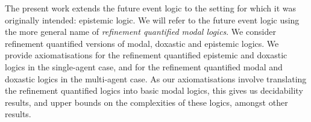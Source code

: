 The present work extends the future event logic to the setting for which it was
originally intended: epistemic logic. We will refer to the future event logic
using the more general name of {\em refinement quantified modal logics}. We
consider refinement quantified versions of modal, doxastic and epistemic logics.
We provide axiomatisations for the refinement quantified epistemic and doxastic
logics in the single-agent case, and for the refinement quantified modal and
doxastic logics in the multi-agent case. As our axiomatisations involve
translating the refinement quantified logics into basic modal logics, this gives
us decidability results, and upper bounds on the complexities of these logics,
amongst other results.
